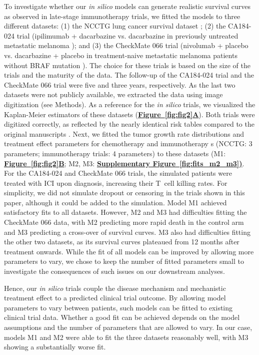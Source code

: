 \documentclass[a4paper,10pt]{article}
\newcommand{\myref}[2]{\hyperref[#1]{\bfseries Figure~\ref*{#1}#2}}
\newcommand{\mysupp}[2]{\hyperref[#1]{\bfseries Supplementary Figure~\ref*{#1}#2}}
\newcommand{\newbit}{\color{red!70!black}}
\begin{document}
To investigate whether our \emph{in silico} models can generate
realistic survival curves as observed in late-stage immunotherapy trials, we
fitted the models to three different datasets: (1) the NCCTG lung cancer
survival dataset \cite{Loprinzi1994}; (2) the CA184-024 trial (ipilimumab +
dacarbazine vs. dacarbazine in previously untreated metastatic melanoma
\cite{Maio2015}); and (3) the CheckMate 066 trial (nivolumab + placebo vs.
dacarbazine + placebo in treatment-naive metastatic melanoma patients without
BRAF mutation \cite{Ascierto2019}). The choice for these trials is based on the
size of the trials and the maturity of the data. The follow-up of the CA184-024
trial and the CheckMate 066 trial were five and three years, respectively. As
the last two datasets were not publicly available, we extracted the data using
image digitization (see Methods). As a reference for the \emph{in silico}
trials, we visualized the Kaplan-Meier estimators of these datasets
(\myref{fig:fig2}{A}). Both trials were digitized correctly, as reflected by
the nearly identical risk tables compared to the original manuscripts
\cite{Maio2015,Ascierto2019}. 
{\newbit 
{}
Next, we fitted the tumor growth rate distributions
and treatment effect parameters for chemotherapy and immunotherapy s
(NCCTG: 3 parameters; immunotherapy trials: 4 parameters)
to these datasets (M1: \myref{fig:fig2}{B}; M2, M3: \mysupp{fig:fits_m2_m3}).
For the CA184-024 and CheckMate 066 trials, the simulated patients were
treated with ICI upon diagnosis, increasing their T~cell killing rates.
For simplicity, we did not simulate dropout or censoring in the trials shown in
this paper, although it could be added to the simulation. Model M1 achieved satisfactory
fits to all datasets. However, M2 and M3 had difficulties fitting the CheckMate 066 data, 
with M2 predicting more rapid death in the control arm and M3 predicting a cross-over
of survival curves. M3 also had difficulties fitting the other two datasets, as its
survival curves plateaued from 12 months after treatment onwards.
While the fit of all models can be improved by allowing more parameters
to vary, we chose to keep the number of fitted parameters small
to investigate the consequences of such issues on our downstream analyses.} 

Hence, our \emph{in silico} trials couple the disease mechanism and mechanistic treatment
effect to a predicted clinical trial outcome. By allowing model parameters to vary 
between patients, such models can be fitted to existing clinical trial data. Whether
 a good fit can be achieved depends on the model assumptions and the number of parameters
that are allowed to vary. In our case, models M1 and M2 were able to fit the three
datasets reasonably well, with M3 showing a substantially worse fit.  
\end{document}
